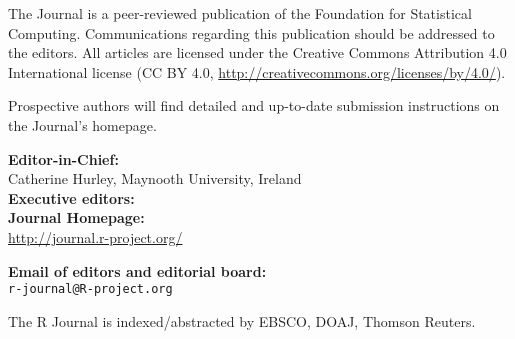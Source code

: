 \documentclass[a4paper,twoside]{report}
\begin{document}
\sectionhead{}

\titlepage

\vspace*{1in}
\begin{center}
\begin{minipage}{0.65\textwidth}
    \begin{center}
    The \R{} Journal is a peer-reviewed publication of
    the \R{} Foundation for Statistical Computing. Communications
    regarding this publication should be addressed to the editors. All
    articles are licensed under the Creative Commons Attribution 4.0
    International license (CC BY 4.0, \url{http://creativecommons.org/licenses/by/4.0/}).
    \bigskip

    Prospective authors will find detailed and up-to-date submission
    instructions on the Journal's homepage.


    \bigskip
      \textbf{Editor-in-Chief:}\\
              Catherine Hurley, Maynooth University, Ireland
      \\

    \bigskip
      \textbf{Executive editors:}\\
      



    \bigskip
    \textbf{\R{} Journal Homepage:}\\
    \url{http://journal.r-project.org/}

    \bigskip
    \textbf{Email of editors and editorial board:}\\
    \texttt{r-journal@R-project.org}

    \bigskip The R Journal is indexed/abstracted by EBSCO, DOAJ, Thomson Reuters.


\end{center}
\end{minipage}
\end{center}
\end{document}
